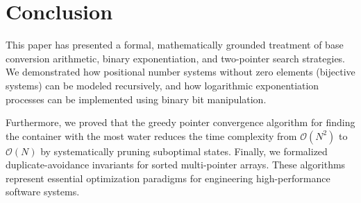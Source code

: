 \documentclass[10pt,journal,compsoc,onecolumn]{IEEEtran}
\begin{document}
\section{Conclusion}
\label{sec:conclusion}

This paper has presented a formal, mathematically grounded treatment of base conversion arithmetic, binary exponentiation, and two-pointer search strategies. We demonstrated how positional number systems without zero elements (bijective systems) can be modeled recursively, and how logarithmic exponentiation processes can be implemented using binary bit manipulation. 

Furthermore, we proved that the greedy pointer convergence algorithm for finding the container with the most water reduces the time complexity from $\mathcal{O}(N^2)$ to $\mathcal{O}(N)$ by systematically pruning suboptimal states. Finally, we formalized duplicate-avoidance invariants for sorted multi-pointer arrays. These algorithms represent essential optimization paradigms for engineering high-performance software systems.
\end{document}
